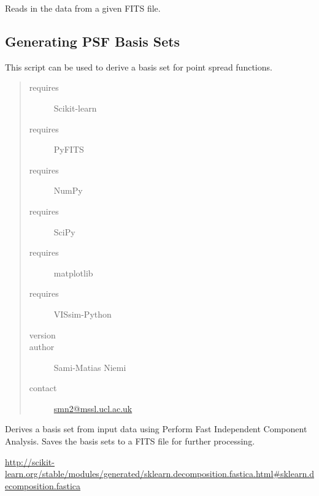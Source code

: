 \documentclass[a4paper,11pt,english]{sphinxmanual}
\begin{document}
\begin{fulllineitems}
\label{analysis:analysis.PSFproperties.readData}
Reads in the data from a given FITS file.

\end{fulllineitems}

\label{analysis:module-analysis.PSFbasisSets}

\subsection{Generating PSF Basis Sets}
\label{analysis:generating-psf-basis-sets}
This script can be used to derive a basis set for point spread functions.
\begin{quote}\begin{description}
\item[{requires}] \leavevmode
Scikit-learn

\item[{requires}] \leavevmode
PyFITS

\item[{requires}] \leavevmode
NumPy

\item[{requires}] \leavevmode
SciPy

\item[{requires}] \leavevmode
matplotlib

\item[{requires}] \leavevmode
VISsim-Python

\item[{version}] 

\item[{author}] \leavevmode
Sami-Matias Niemi

\item[{contact}] \leavevmode
\href{mailto:smn2@mssl.ucl.ac.uk}{smn2@mssl.ucl.ac.uk}

\end{description}\end{quote}

\begin{fulllineitems}
\label{analysis:analysis.PSFbasisSets.deriveBasisSetsICA}
Derives a basis set from input data using Perform Fast Independent Component Analysis.
Saves the basis sets to a FITS file for further processing.

\href{http://scikit-learn.org/stable/modules/generated/sklearn.decomposition.fastica.html\#sklearn.decomposition.fastica}{http://scikit-learn.org/stable/modules/generated/sklearn.decomposition.fastica.html\#sklearn.decomposition.fastica}

\end{fulllineitems}
\end{document}
